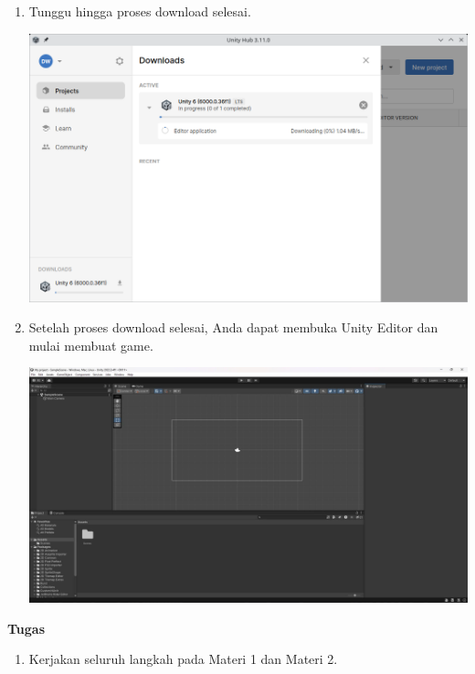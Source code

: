 \documentclass{article}
\begin{document}
\begin{flushleft}
\begin{enumerate}
            \item Tunggu hingga proses download selesai.
            \begin{center}
                \includegraphics[scale=0.3]{08_download.png}
            \end{center}

            \item Setelah proses download selesai, Anda dapat membuka Unity Editor dan mulai membuat game.
            
            \begin{center}
                \includegraphics[scale=0.11]{09_editor.png}
            \end{center}
        \end{enumerate}
    \end{flushleft}

    \newpage
    \begin{flushleft}
        \textbf{Tugas}
        \newline

        \begin{enumerate}
            \item Kerjakan seluruh langkah pada Materi 1 dan Materi 2.
        \end{enumerate}
    \end{flushleft}
\end{document}
